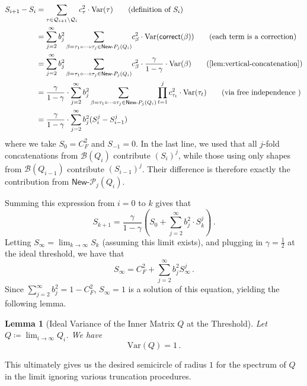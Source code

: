 \documentclass[12pt]{article}
\newcommand{\Var}{\mathrm{Var}}
\newtheorem{lemma}[theorem]{Lemma}
\newcommand{\calQ}{\mathcal{Q}}
\newcommand{\gam}{\gamma}
\newcommand{\corr}{\mathsf{correct}}
\newcommand{\Authornote}[3]{{\sf\footnotesize\color{#3}{[#1: #2]}}}
\newcommand{\Authornote}[3]{}
\newcommand{\snote}[1]{\Authornote{Sofia}{#1}{orange}}
\begin{document}
\begin{align*}
S_{i+1} - S_i &= \sum_{\tau\in \calQ_{i+1}\setminus \calQ_{i}} c_\tau^2  \cdot \Var(\tau) \tag{definition of \(S_i\)} \\&= 
 \sum_{j = 2}^{\infty}{b_j^2\sum_{\beta = \tau_1 \circ \cdots \circ \tau_j \in \textsf{New-}P_j(Q_i)}}  c_\beta^2  \cdot \Var(\corr(\beta)) \tag{each term is a correction} \\ 
 &=  \sum_{j = 2}^{\infty}{b_j^2\sum_{\beta = \tau_1 \circ \cdots \circ \tau_j \in \textsf{New-}P_j(Q_i)}}  c_\beta^2   \cdot \frac{\gamma}{1-\gam } \cdot \Var(\beta)  \tag{\cref{lem:vertical-concatenation}}\\ 
&=\frac{\gam}{1-\gam } \cdot  \sum_{j = 2}^{\infty}{b_j^2\sum_{\beta = \tau_1 \circ \cdots \circ \tau_j \in \textsf{New-}P_j(Q_i)} \prod_{t=1}^j c_{\tau_t}^2} \cdot \Var(\tau_t) \tag{via free independence }\\
&= \frac{\gam }{1-\gam } \cdot  \sum_{j = 2}^{\infty}{b_j^2(S_i^j - S_{i-1}^j)} 
\end{align*}
where we take $S_0 =  C_F^2$  and $S_{-1} = 0$. In the last line, we used that all \(j\)-fold concatenations from \(\mathcal B(Q_i)\) contribute \((S_i)^j\), while those using only shapes from \(\mathcal B(Q_{i-1})\) contribute \((S_{i-1})^j\). Their difference is therefore exactly the contribution from \(\textsf{New-}\mathcal P_j(Q_i)\).


 Summing this expression from $i = 0$ to $k$ gives that 
\[
S_{k+1} = \frac{\gam}{1-\gamma}( S_0 +  \sum_{j=2}^{\infty}{{b_j^2} \cdot S_k^j}) \,.
\]
Letting $S_{\infty} = \lim_{k \to \infty}{S_k}$ (assuming this limit exists), and plugging in $\gam= \frac{1}{2}$ at the ideal threshold,  we have that 
\[S_{\infty} = C_F^2 + \sum_{j=2}^{\infty}{{b_j^2}S_{\infty}^j}\,.\] Since $\sum_{j=2}^{\infty}{b_j^2} = 1 - C_F^2$, $S_{\infty} = 1$ is a solution of this equation, yielding the following lemma.
\begin{lemma}[Ideal Variance of the Inner Matrix $Q$ at the Threshold]
	Let $Q \coloneqq \lim_{i\rightarrow \infty} Q_i$. We have 
	\[ 
	\Var(Q) = 1\,.
	\]
\end{lemma} 
This ultimately gives us the desired semicircle of radius $1$ for the spectrum of $Q$ in the limit ignoring various truncation procedures. 

\end{document}
